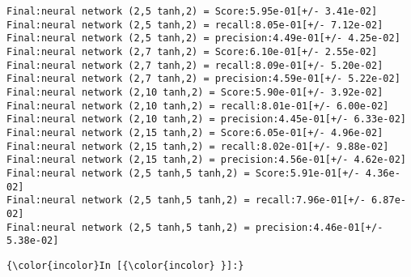 \documentclass[11pt]{article}
\begin{document}
    \begin{Verbatim}[commandchars=\\\{\}]
Final:neural network (2,5 tanh,2) = Score:5.95e-01[+/- 3.41e-02]
Final:neural network (2,5 tanh,2) = recall:8.05e-01[+/- 7.12e-02]
Final:neural network (2,5 tanh,2) = precision:4.49e-01[+/- 4.25e-02]
Final:neural network (2,7 tanh,2) = Score:6.10e-01[+/- 2.55e-02]
Final:neural network (2,7 tanh,2) = recall:8.09e-01[+/- 5.20e-02]
Final:neural network (2,7 tanh,2) = precision:4.59e-01[+/- 5.22e-02]
Final:neural network (2,10 tanh,2) = Score:5.90e-01[+/- 3.92e-02]
Final:neural network (2,10 tanh,2) = recall:8.01e-01[+/- 6.00e-02]
Final:neural network (2,10 tanh,2) = precision:4.45e-01[+/- 6.33e-02]
Final:neural network (2,15 tanh,2) = Score:6.05e-01[+/- 4.96e-02]
Final:neural network (2,15 tanh,2) = recall:8.02e-01[+/- 9.88e-02]
Final:neural network (2,15 tanh,2) = precision:4.56e-01[+/- 4.62e-02]
Final:neural network (2,5 tanh,5 tanh,2) = Score:5.91e-01[+/- 4.36e-02]
Final:neural network (2,5 tanh,5 tanh,2) = recall:7.96e-01[+/- 6.87e-02]
Final:neural network (2,5 tanh,5 tanh,2) = precision:4.46e-01[+/- 5.38e-02]

    \end{Verbatim}

    \begin{Verbatim}[commandchars=\\\{\}]
{\color{incolor}In [{\color{incolor} }]:} 
\end{Verbatim}


    
    
    
    
\end{document}
